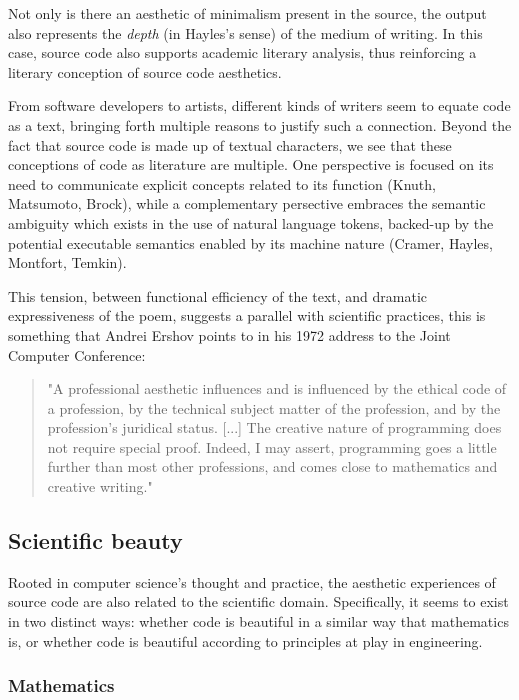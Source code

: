 Not only is there an aesthetic of minimalism present in the source, the output also represents the \emph{depth} (in Hayles's sense) of the medium of writing. In this case, source code also supports academic literary analysis, thus reinforcing a literary conception of source code aesthetics.

From software developers to artists, different kinds of writers seem to equate code as a text, bringing forth multiple reasons to justify such a connection. Beyond the fact that source code is made up of textual characters, we see that these conceptions of code as literature are multiple. One perspective is focused on its need to communicate explicit concepts related to its function (Knuth, Matsumoto, Brock), while a complementary persective embraces the semantic ambiguity which exists in the use of natural language tokens, backed-up by the potential executable semantics enabled by its machine nature (Cramer, Hayles, Montfort, Temkin).

This tension, between functional efficiency of the text, and dramatic expressiveness of the poem, suggests a parallel with scientific practices, this is something that Andrei Ershov points to in his 1972 address to the Joint Computer Conference:

\begin{quote}
  "A professional aesthetic influences and is influenced by the ethical code of a profession, by the technical subject matter of the profession, and by the profession's juridical status. [...] The creative nature  of programming does not require special proof. Indeed, I may assert, programming goes a little further than most other professions, and comes close to mathematics and creative writing." \citep{ershov_aesthetics_1972}
\end{quote}

\subsection{Scientific beauty}
\label{subsec:scientific-beauty}

Rooted in computer science's thought and practice, the aesthetic experiences of source code are also related to the scientific domain. Specifically, it seems to exist in two distinct ways: whether code is beautiful in a similar way that mathematics is, or whether code is beautiful according to principles at play in engineering.

\subsubsection{Mathematics}
\label{subsubsec:beauty-mathematics}

